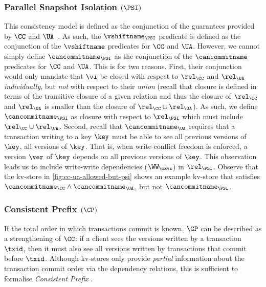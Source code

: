 \subsubsection{Parallel Snapshot Isolation $(\PSI)$} 
This consistency model is defined as the conjunction of the guarantees provided by $\CC$ and $\UA$~\cite{framework-concur}. 
As such, the $\vshiftname_{\PSI}$ predicate is defined as the conjunction of the $\vshiftname$ predicates for $\CC$ and $\UA$.
However, we cannot simply define $\cancommitname_{\PSI}$ as the conjunction of the $\cancommitname$ predicates for $\CC$ and $\UA$. 
This is for two reasons. 
First, their conjunction would only mandate that $\vi$ be closed with respect to 
$\rel_{\CC}$ and $\rel_{\UA}$ \emph{individually}, but \emph{not} with respect to their \emph{union} (recall that closure is defined in terms of the transitive closure of a given relation and thus the closure of $\rel_{\CC}$ and $\rel_{\UA}$ is smaller than the closure of $\rel_{\CC} \cup \rel_{\UA}$).
As such, we define $\cancommitname_{\PSI}$ as closure with respect to $\rel_{\PSI}$ which must include $\rel_{\CC} \cup \rel_{\UA}$.
Second, recall that $\cancommitname_{\UA}$ requires that a transaction writing 
to a key $\key$ must be able to see all previous versions of $\key$, \ie all versions of $\key$. 
That is, when write-conflict freedom is enforced, a version $\ver$ of $\key$ depends on all 
previous versions of $\key$. 
This observation leads us to include write-write dependencies ($\WW_{\mkvs}$) in $\rel_{\PSI}$. 
Observe that the kv-store in \cref{fig:cc-ua-allowed-but-psi} shows an example kv-store that satisfies $\cancommitname_{\CC} \land \cancommitname_{\UA}$, 
but not $\cancommitname_{\PSI}$.

\subsubsection{Consistent Prefix $(\CP)$}
\label{para:cp}
If the total order in which transactions commit is known, $\CP$
can be described as a strengthening of $\CC$: 
if a client sees the versions written by a transaction $\txid$,
then it must also see all versions written by transactions that commit before $\txid$. 
Although kv-stores only provide {\em partial} information about the transaction commit order via the dependency relations,
this is sufficient to formalise \emph{Consistent Prefix} \cite{laws}.

